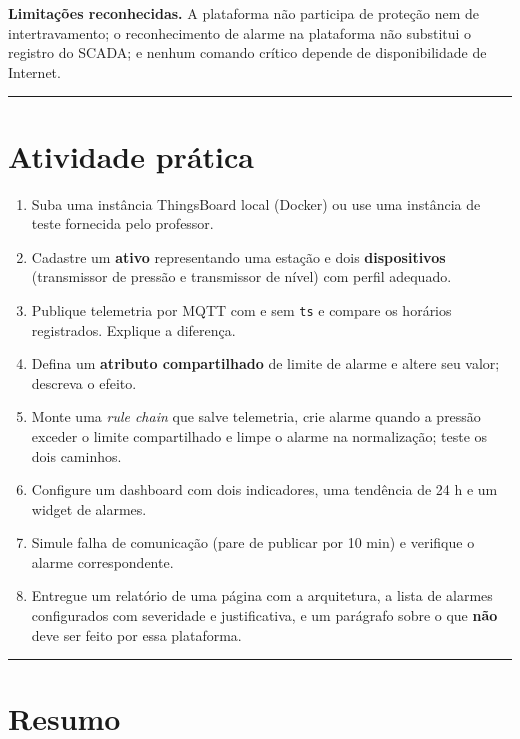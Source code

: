 \textbf{Limitações reconhecidas.} A plataforma não participa de proteção nem de intertravamento; o reconhecimento de alarme na plataforma não substitui o registro do SCADA; e nenhum comando crítico depende de disponibilidade de Internet.

\begin{center}\rule{0.5\linewidth}{0.5pt}\end{center}

\section{Atividade prática}\label{atividade-pruxe1tica}

\begin{enumerate}
\def\labelenumi{\arabic{enumi}.}
\tightlist
\item
  Suba uma instância ThingsBoard local (Docker) ou use uma instância de teste fornecida pelo professor.
\item
  Cadastre um \textbf{ativo} representando uma estação e dois \textbf{dispositivos} (transmissor de pressão e transmissor de nível) com perfil adequado.
\item
  Publique telemetria por MQTT com e sem \passthrough{\lstinline!ts!} e compare os horários registrados. Explique a diferença.
\item
  Defina um \textbf{atributo compartilhado} de limite de alarme e altere seu valor; descreva o efeito.
\item
  Monte uma \emph{rule chain} que salve telemetria, crie alarme quando a pressão exceder o limite compartilhado e limpe o alarme na normalização; teste os dois caminhos.
\item
  Configure um dashboard com dois indicadores, uma tendência de 24 h e um widget de alarmes.
\item
  Simule falha de comunicação (pare de publicar por 10 min) e verifique o alarme correspondente.
\item
  Entregue um relatório de uma página com a arquitetura, a lista de alarmes configurados com severidade e justificativa, e um parágrafo sobre o que \textbf{não} deve ser feito por essa plataforma.
\end{enumerate}

\begin{center}\rule{0.5\linewidth}{0.5pt}\end{center}

\section{Resumo}\label{resumo}

